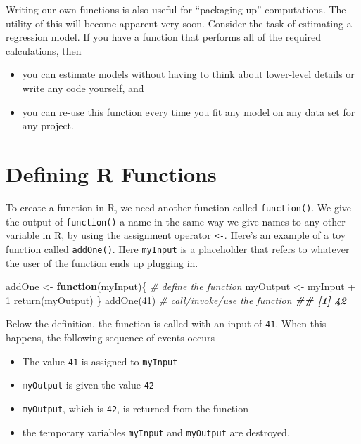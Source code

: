 \documentclass[
  12pt,
  krantz2]{krantz}
\makeatletter
\newenvironment{Shaded}{\begin{snugshade}}{\end{snugshade}}
\newcommand{\CommentTok}[1]{\textcolor[rgb]{0.37,0.37,0.37}{\textit{#1}}}
\newcommand{\ControlFlowTok}[1]{\textcolor[rgb]{0.27,0.27,0.27}{\textbf{#1}}}
\newcommand{\DecValTok}[1]{\textcolor[rgb]{0.06,0.06,0.06}{#1}}
\newcommand{\DocumentationTok}[1]{\textcolor[rgb]{0.37,0.37,0.37}{\textbf{\textit{#1}}}}
\newcommand{\FunctionTok}[1]{\textcolor[rgb]{0,0,0}{#1}}
\newcommand{\NormalTok}[1]{#1}
\newcommand{\OtherTok}[1]{\textcolor[rgb]{0.37,0.37,0.37}{#1}}
\newcommand{\SpecialCharTok}[1]{\textcolor[rgb]{0,0,0}{#1}}
\providecommand{\tightlist}{%
  \setlength{\itemsep}{0pt}\setlength{\parskip}{0pt}}
\newenvironment{kframe}{%
\medskip{}
\setlength{\fboxsep}{.8em}
 \def\at@end@of@kframe{}%
 \ifinner\ifhmode%
  \def\at@end@of@kframe{\end{minipage}}%
  \begin{minipage}{\columnwidth}%
 \fi\fi%
 \def\FrameCommand##1{\hskip\@totalleftmargin \hskip-\fboxsep
 \colorbox{shadecolor}{##1}\hskip-\fboxsep
     \hskip-\linewidth \hskip-\@totalleftmargin \hskip\columnwidth}%
 \MakeFramed {\advance\hsize-\width
   \@totalleftmargin\z@ \linewidth\hsize
   \@setminipage}}%
 {\par\unskip\endMakeFramed%
 \at@end@of@kframe}
\renewenvironment{Shaded}{\begin{kframe}}{\end{kframe}}
\makeatother
\begin{document}
Writing our own functions is also useful for ``packaging up'' computations. The utility of this will become apparent very soon. Consider the task of estimating a regression model. If you have a function that performs all of the required calculations, then

\begin{itemize}
\tightlist
\item
  you can estimate models without having to think about lower-level details or write any code yourself, and
\item
  you can re-use this function every time you fit any model on any data set for any project.
\end{itemize}

\hypertarget{defining-r-functions}{%
\section{Defining R Functions}\label{defining-r-functions}}

To create a function in R, we need another function called \texttt{function()}. We give the output of \texttt{function()} a name in the same way we give names to any other variable in R, by using the assignment operator \texttt{\textless{}-}. Here's an example of a toy function called \texttt{addOne()}. Here \texttt{myInput} is a placeholder that refers to whatever the user of the function ends up plugging in.

\begin{Shaded}
\begin{Highlighting}[]
\NormalTok{addOne }\OtherTok{\textless{}{-}} \ControlFlowTok{function}\NormalTok{(myInput)\{  }\CommentTok{\# define the function}
\NormalTok{  myOutput }\OtherTok{\textless{}{-}}\NormalTok{ myInput }\SpecialCharTok{+} \DecValTok{1}
  \FunctionTok{return}\NormalTok{(myOutput)}
\NormalTok{\}}
\FunctionTok{addOne}\NormalTok{(}\DecValTok{41}\NormalTok{) }\CommentTok{\# call/invoke/use the function }
\DocumentationTok{\#\# [1] 42}
\end{Highlighting}
\end{Shaded}

Below the definition, the function is called with an input of \texttt{41}. When this happens, the following sequence of events occurs

\begin{itemize}
\tightlist
\item
  The value \texttt{41} is assigned to \texttt{myInput}
\item
  \texttt{myOutput} is given the value \texttt{42}
\item
  \texttt{myOutput}, which is \texttt{42}, is returned from the function
\item
  the temporary variables \texttt{myInput} and \texttt{myOutput} are destroyed.
\end{itemize}
\end{document}
